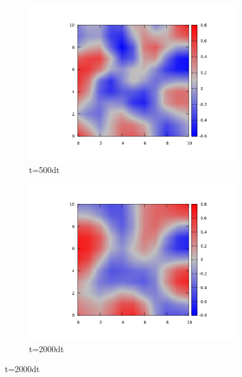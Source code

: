 \documentclass{article}
\begin{document}
\begin{figure}
\centering
\begin{subfigure}{.5\textwidth}
  \centering
  \includegraphics[width=1.0\linewidth]{500dt.png}
  \caption{t=500dt}
  \label{fig:sub1}
\end{subfigure}%
\begin{subfigure}{.5\textwidth}
  \centering
  \includegraphics[width=1.0\linewidth]{2000dt.png}
  \caption{t=2000dt}
  \label{fig:sub2}
\end{subfigure}
\label{fig:test}
\end{figure}
\end{document}
